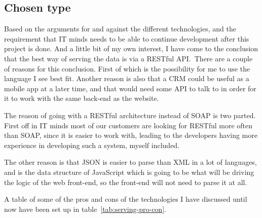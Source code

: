 \subsection{Chosen type }
\label{sub:Chosen type}
Based on the arguments for and against the different technologies, and the
requirement that IT minds needs to be able to continue development after this
project is done. And a little bit of my own interest, I have come to the
conclusion that the best way of serving the data is via a RESTful API.\ There are
a couple of reasons for this conclusion. First of which is the possibility for
me to use the language I see best fit. Another reason is also that a CRM could
be useful as a mobile app at a later time, and that would need some API to talk
to in order for it to work with the same back-end as the website. 

The reason of going with a RESTful architecture instead of SOAP is two parted.
First off in IT minds most of our customers are looking for RESTful more often
than SOAP, since it is easier to work with, leading to the developers having
more experience in developing such a system, myself included. 

The other reason is that JSON is easier to parse than XML in a lot of languages,
and is the data structure of  JavaScript which is going to be what will be
driving the logic of the web front-end, so the front-end will not need to parse it
at all. 

A table of some of the pros and cons of the technologies I have discussed until
now have been set up in table~\ref{tab:serving-pro-con}. 

\begin{table}[h]
  \caption{Pros and cons of different ways of serving the data}
\label{tab:serving-pro-con}
\end{table}

